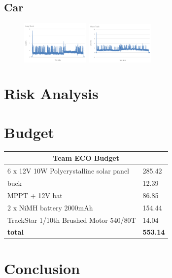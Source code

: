 \documentclass[11pt]{article}
\begin{document}
\subsection{Car}
\begin{figure}[h!]
    \begin{center}
        \includegraphics[width=0.3\textwidth]{inc/long_lap.png}
        \includegraphics[width=0.3\textwidth]{inc/short_lap.png}
    \end{center}
\end{figure}
\section{Risk Analysis}

\section{Budget}

\begin{table}[h!]
    \begin{center}        
    \begin{tabular}{|l|l|}
    \hline
    \multicolumn{2}{|c|}{\textbf{Team ECO Budget}}            \\ \hline
    6 x 12V 10W Polycrystalline solar panel & 285.42 \\ \hline
    buck                                    & 12.39  \\ \hline
    MPPT + 12V bat                          & 86.85  \\ \hline
    2 x NiMH battery 2000mAh                & 154.44 \\ \hline
    TrackStar 1/10th Brushed Motor 540/80T  & 14.04  \\ \hline
    \textbf{total}                          & \textbf{553.14} \\ \hline
    \end{tabular}
    \end{center}
    \end{table}
\section{Conclusion}



\end{document}
